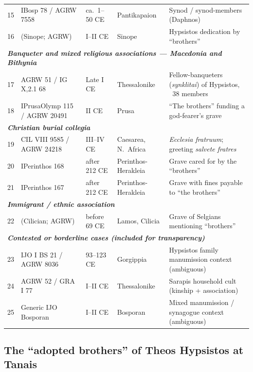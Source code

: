 \documentclass[11pt,oneside]{article}
\begin{document}
\begin{center}
\begin{tabular}{@{}clllp{3.3cm}@{}}
15 & IBosp 78 / AGRW 7558          & ca.~1--50 CE & Pantikapaion & Synod / synod-members (Daphnos) \\
16 & (Sinope; AGRW)                & I--II CE    & Sinope       & Hypsistos dedication by ``brothers'' \\
\multicolumn{5}{l}{\textit{\textbf{Banqueter and mixed religious associations — Macedonia and Bithynia}}} \\
17 & AGRW 51 / IG X,2.1 68         & Late I CE   & Thessalonike & Fellow-banqueters (\textit{synklitai}) of Hypsistos, ~38 members \\
18 & IPrusaOlymp 115 / AGRW 20491  & II CE       & Prusa        & ``The brothers'' funding a god-fearer's grave \\
\multicolumn{5}{l}{\textit{\textbf{Christian burial collegia}}} \\
19 & CIL VIII 9585 / AGRW 24218    & III--IV CE  & Caesarea, N.\ Africa & \textit{Ecclesia fratruum}; greeting \textit{salvete fratres} \\
20 & IPerinthos 168                & after 212 CE & Perinthos-Herakleia & Grave cared for by the ``brothers'' \\
21 & IPerinthos 167                & after 212 CE & Perinthos-Herakleia & Grave with fines payable to ``the brothers'' \\
\multicolumn{5}{l}{\textit{\textbf{Immigrant / ethnic association}}} \\
22 & (Cilician; AGRW)              & before 69 CE & Lamos, Cilicia & Grave of Selgians mentioning ``brothers'' \\
\multicolumn{5}{l}{\textit{\textbf{Contested or borderline cases (included for transparency)}}} \\
23 & IJO I BS 21 / AGRW 8036       & 93--123 CE  & Gorgippia    & Hypsistos family manumission context (ambiguous) \\
24 & AGRW 52 / GRA I 77            & I--II CE    & Thessalonike & Sarapis household cult (kinship + association) \\
25 & Generic IJO Bosporan          & I--II CE    & Bosporan     & Mixed manumission / synagogue context (ambiguous) \\
\bottomrule
\end{tabular}
\end{center}

\subsection*{The ``adopted brothers'' of Theos Hypsistos at Tanais}
\end{document}
